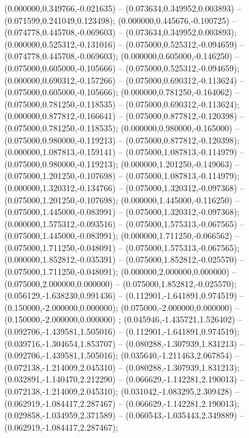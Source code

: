  (0.000000,0.349766,-0.021635) -- (0.073634,0.349952,0.003893) -- (0.071599,0.241049,0.123498);
 (0.000000,0.445676,-0.100725) -- (0.074778,0.445708,-0.069603) -- (0.073634,0.349952,0.003893);
 (0.000000,0.525312,-0.131016) -- (0.075000,0.525312,-0.094659) -- (0.074778,0.445708,-0.069603);
 (0.000000,0.605000,-0.146250) -- (0.075000,0.605000,-0.105666) -- (0.075000,0.525312,-0.094659);
 (0.000000,0.690312,-0.157266) -- (0.075000,0.690312,-0.113624) -- (0.075000,0.605000,-0.105666);
 (0.000000,0.781250,-0.164062) -- (0.075000,0.781250,-0.118535) -- (0.075000,0.690312,-0.113624);
 (0.000000,0.877812,-0.166641) -- (0.075000,0.877812,-0.120398) -- (0.075000,0.781250,-0.118535);
 (0.000000,0.980000,-0.165000) -- (0.075000,0.980000,-0.119213) -- (0.075000,0.877812,-0.120398);
 (0.000000,1.087813,-0.159141) -- (0.075000,1.087813,-0.114979) -- (0.075000,0.980000,-0.119213);
 (0.000000,1.201250,-0.149063) -- (0.075000,1.201250,-0.107698) -- (0.075000,1.087813,-0.114979);
 (0.000000,1.320312,-0.134766) -- (0.075000,1.320312,-0.097368) -- (0.075000,1.201250,-0.107698);
 (0.000000,1.445000,-0.116250) -- (0.075000,1.445000,-0.083991) -- (0.075000,1.320312,-0.097368);
 (0.000000,1.575312,-0.093516) -- (0.075000,1.575313,-0.067565) -- (0.075000,1.445000,-0.083991);
 (0.000000,1.711250,-0.066562) -- (0.075000,1.711250,-0.048091) -- (0.075000,1.575313,-0.067565);
 (0.000000,1.852812,-0.035391) -- (0.075000,1.852812,-0.025570) -- (0.075000,1.711250,-0.048091);
 (0.000000,2.000000,0.000000) -- (0.075000,2.000000,0.000000) -- (0.075000,1.852812,-0.025570);
 (0.056129,-1.638230,0.991436) -- (0.112901,-1.641891,0.974519) -- (0.150000,-2.000000,0.000000);
 (0.075000,-2.000000,0.000000) -- (0.150000,-2.000000,0.000000) ;
 (0.045946,-1.435721,1.526402) -- (0.092706,-1.439581,1.505016) -- (0.112901,-1.641891,0.974519);
 (0.039716,-1.304654,1.853707) -- (0.080288,-1.307939,1.831213) -- (0.092706,-1.439581,1.505016);
 (0.035640,-1.211463,2.067854) -- (0.072138,-1.214009,2.045310) -- (0.080288,-1.307939,1.831213);
 (0.032891,-1.140470,2.212290) -- (0.066629,-1.142281,2.190013) -- (0.072138,-1.214009,2.045310);
 (0.031042,-1.083295,2.309428) -- (0.062919,-1.084417,2.287467) -- (0.066629,-1.142281,2.190013);
 (0.029858,-1.034959,2.371589) -- (0.060543,-1.035443,2.349889) -- (0.062919,-1.084417,2.287467);
